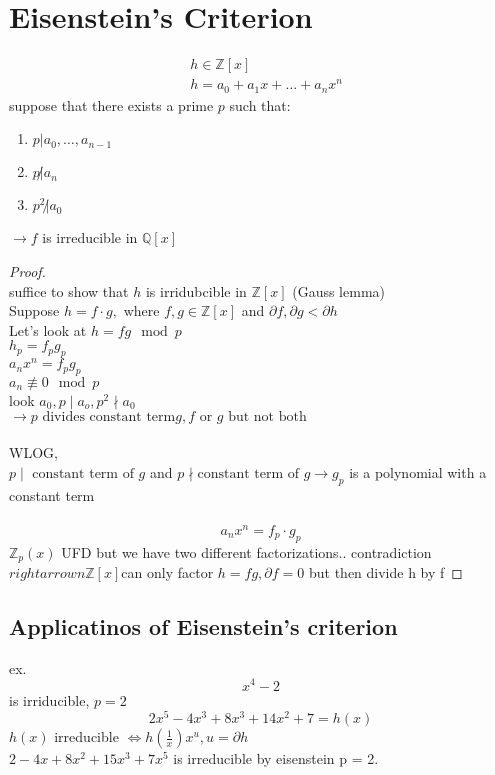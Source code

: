 \documentclass{article}
\begin{document}
\section{Eisenstein's Criterion}
\begin{align*}
&h \in \mathbb{Z}[x] \\
&h = a_0 + a_1 x + \dots + a_nx^n
\end{align*}
suppose that there exists a prime $p$ such that:
\begin{enumerate}
    \item $p | a_0, \dots, a_{n-1}$
    \item $p \not | a_n$
    \item $p^2 \not | a_0$
\end{enumerate}
$\rightarrow f$ is irreducible in $\mathbb{Q}[x]$
\begin{proof}
    \leavevmode \\ 
    suffice to show that $h$ is irridubcible in $\mathbb{Z}[x]$ (Gauss lemma) \\ 
    Suppose $h = f \cdot g,\text{ where }f,g \in \mathbb{Z} [x]$ and $\partial f, \partial g < \partial h$ \\ 
    Let's look at $h  = fg \mod p$ \\ 
    $h_p = f_p g_p$ \\ 
    $a_nx^n= f_p g_p$  \\ 
    $a_n \not \equiv 0 \mod p$ \\ 
    look $a_0, p \mid a_o, p^2\nmid a_0$
    \\ 
    $\rightarrow p \text{ divides constant term} g, f \text{ or } g \text{ but not both}$ \\ \\ 
    WLOG,  \\ 
    $p \mid \text{ constant term of }g$ and $p\nmid \text{constant term of } g \rightarrow g_p$ is a polynomial with a constant term \\ 
    \\ 
    $$a_nx^n =f_p \cdot g_p$$ 
    $\mathbb{Z}_p(x) $ UFD but we have two different factorizations.. contradiction
    \\ 
    $rightarrow n \mathbb{Z}[x]$can only factor $h =fg, \partial f = 0$ but then divide h by f 
\end{proof}
\subsection{Applicatinos of Eisenstein's criterion}
ex. $$x^4 - 2$$ is irriducible, $p = 2$ 
$$2x^5 - 4x^3 + 8x^3 +14x^2 + 7 = h(x) $$
$h(x)$ irreducible $\Leftrightarrow h(\frac{1}{x})x^u, u = \partial h$ \\ 
$ 2- 4x + 8x^2 +15x^3 +7x^5 $ is irreducible by eisenstein p = 2. 
\end{document}
